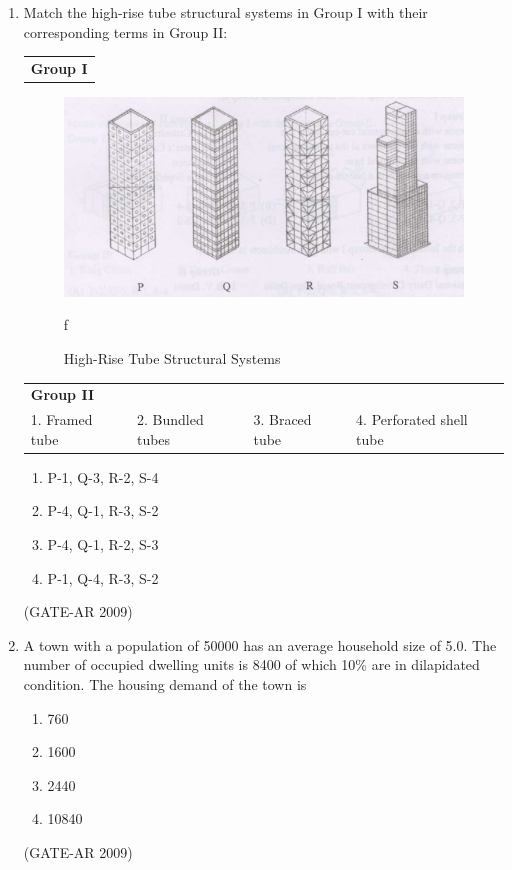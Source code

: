 \documentclass[a4paper,10pt]{article}
\begin{document}
\begin{enumerate}
    \item Match the high-rise tube structural systems in Group I with their corresponding terms in Group II:  \\
    \begin{tabular}{ l }
	\textbf{Group I} \\
	\end{tabular}
	\begin{figure}[h!]
        \centering
        \includegraphics[width=0.5\columnwidth]{figs/2.png}
	\caption{High-Rise Tube Structural Systems}
    \label{fig:Img02}f
	\end{figure}
    \begin{tabular}{ l l l l }
	\textbf{Group II} & & & \\
	1. Framed tube & 2. Bundled tubes & 3. Braced tube & 4. Perforated shell tube \\
	\end{tabular}
	\begin{multicols}{2}
	\begin{enumerate}
        \item P-1, Q-3, R-2, S-4
        \item P-4, Q-1, R-3, S-2
        \item P-4, Q-1, R-2, S-3
        \item P-1, Q-4, R-3, S-2
    \end{enumerate}
	\end{multicols}
    \hfill (GATE-AR 2009)

    \item A town with a population of 50000 has an average household size of 5.0. The number of occupied dwelling units is 8400 of which 10\% are in dilapidated condition. The housing demand of the town is 
    \begin{multicols}{4}
	\begin{enumerate}
        \item 760
        \item 1600
        \item 2440
        \item 10840
    \end{enumerate}
	\end{multicols}
    \hfill (GATE-AR 2009)


\end{enumerate}
\end{document}
